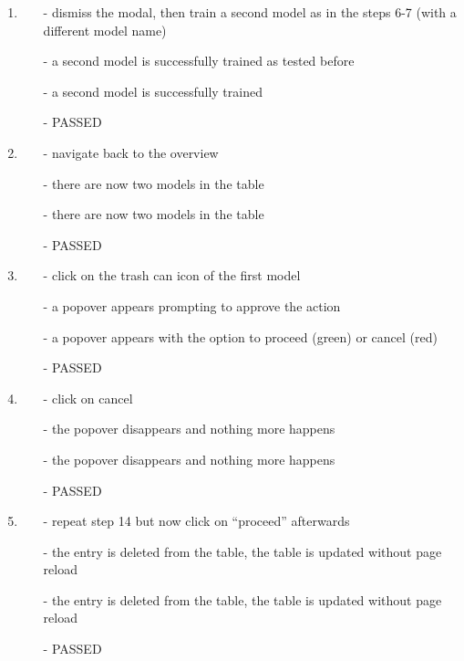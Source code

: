 \begin{description}
\begin{enumerate}
		\item
		\begin{itemize}
			\item [-] dismiss the modal, then train a second model as in the steps 6-7 (with a different model name)
			\item [-] a second model is successfully trained as tested before
			\item [-] a second model is successfully trained
			\item [-] PASSED
		\end{itemize}
		\item
		\begin{itemize}
			\item [-] navigate back to the overview
			\item [-] there are now two models in the table
			\item [-] there are now two models in the table
			\item [-] PASSED
		\end{itemize}
		\item
		\begin{itemize}
			\item [-] click on the trash can icon of the first model
			\item [-] a popover appears prompting to approve the action
			\item [-] a popover appears with the option to proceed (green) or cancel (red)
			\item [-] PASSED
		\end{itemize}
		\item
		\begin{itemize}
			\item [-] click on cancel
			\item [-] the popover disappears and nothing more happens
			\item [-] the popover disappears and nothing more happens
			\item [-] PASSED
		\end{itemize}
		\item
		\begin{itemize}
			\item [-] repeat step 14 but now click on \enquote{proceed} afterwards
			\item [-] the entry is deleted from the table, the table is updated without page reload
			\item [-] the entry is deleted from the table, the table is updated without page reload
			\item [-] PASSED

\end{itemize}
\end{enumerate}
\end{description}
